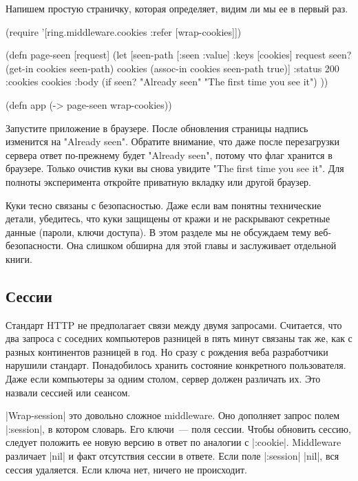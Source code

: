 Напишем простую страничку, которая определяет, видим ли мы ее в первый раз.

\begin{code}
(require '[ring.middleware.cookies
           :refer [wrap-cookies]])

(defn page-seen
  [request]
  (let [seen-path [:seen :value]
        {:keys [cookies]} request
        seen? (get-in cookies seen-path)
        cookies (assoc-in cookies seen-path true)]
    {:status 200
     :cookies cookies
     :body (if seen?
             "Already seen"
             "The first time you see it") }))

(defn app
  (-> page-seen
      wrap-cookies))
\end{code}

Запустите приложение в браузере. После обновления страницы надпись изменится на
"Already seen". Обратите внимание, что даже после перезагрузки сервера ответ
по-прежнему будет "Already seen", потому что флаг хранится в браузере. Только
очистив куки вы снова увидите "The first time you see it". Для полноты
эксперимента откройте приватную вкладку или другой браузер.

Куки тесно связаны с безопасностью. Даже если вам понятны технические детали,
убедитесь, что куки защищены от кражи и не раскрывают секретные данные (пароли,
ключи доступа). В этом разделе мы не обсуждаем тему веб-безопасности. Она
слишком обширна для этой главы и заслуживает отдельной книги.

\subsection{Сессии}

Стандарт HTTP не предполагает связи между двумя запросами. Считается, что два
запроса с соседних компьютеров разницей в пять минут связаны так же, как с
разных континентов разницей в год. Но сразу с рождения веба разработчики
нарушили стандарт. Понадобилось хранить состояние конкретного пользователя. Даже
если компьютеры за одним столом, сервер должен различать их. Это назвали сессией
или сеансом.

\spverb|Wrap-session| это довольно сложное middleware. Оно дополняет запрос полем
\spverb|:session|, в котором словарь. Его ключи~--- поля сессии. Чтобы обновить сессию,
следует положить ее новую версию в ответ по аналогии с \spverb|:cookie|. Middleware
различает \spverb|nil| и факт отсутствия сессии в ответе. Если поле \spverb|:session| \spverb|nil|, вся
сессия удаляется. Если ключа нет, ничего не происходит.

